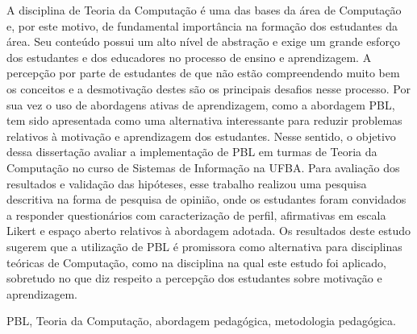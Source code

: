 \resumo
A disciplina de Teoria da Computação é uma das bases
da área de Computação e, por este motivo, de
fundamental importância na formação dos estudantes
da área.
Seu conteúdo possui um alto nível de abstração e exige
um grande esforço dos estudantes e dos educadores
no processo de ensino e aprendizagem.
A percepção por parte de estudantes de
que não estão compreendendo muito bem os conceitos e
a desmotivação destes são os principais desafios nesse processo.
Por sua vez o uso de abordagens ativas de aprendizagem, como
a abordagem \ac{PBL}, tem sido apresentada
como uma alternativa interessante para reduzir problemas relativos à motivação
e aprendizagem dos estudantes.
Nesse sentido, o objetivo dessa dissertação avaliar a implementação
de \ac{PBL} em turmas de Teoria da Computação no curso de Sistemas
de Informação na \ac{UFBA}.
Para avaliação dos resultados e validação das hipóteses,
esse trabalho realizou uma pesquisa descritiva na forma
de pesquisa de opinião, onde
os estudantes foram convidados a responder questionários com
caracterização de perfil, afirmativas em escala Likert e
espaço aberto relativos à abordagem adotada. 
Os resultados deste estudo sugerem que a utilização de \ac{PBL}
é promissora como alternativa para disciplinas teóricas
de Computação, como na disciplina na qual este estudo foi
aplicado, sobretudo no que diz respeito a percepção
dos estudantes sobre motivação e aprendizagem.
\begin{keywords}
\ac{PBL}, Teoria da Computação, abordagem pedagógica, metodologia pedagógica.
\end{keywords}
